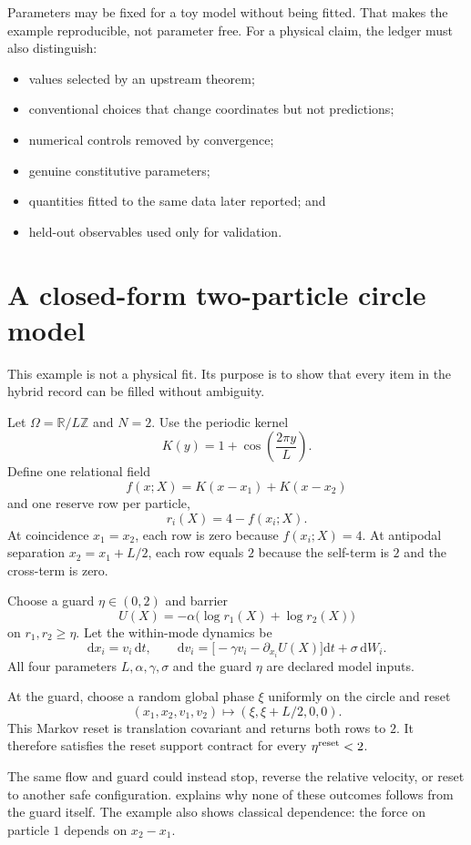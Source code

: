 \documentclass[11pt]{article}
\theoremstyle{definition}
\theoremstyle{remark}
\newcommand{\dd}{\mathrm d}
\begin{document}
Parameters may be fixed for a toy model without being fitted.  That makes
the example reproducible, not parameter free.  For a physical claim, the
ledger must also distinguish:

\begin{itemize}
\item values selected by an upstream theorem;
\item conventional choices that change coordinates but not predictions;
\item numerical controls removed by convergence;
\item genuine constitutive parameters;
\item quantities fitted to the same data later reported; and
\item held-out observables used only for validation.
\end{itemize}

\section{A closed-form two-particle circle model}
\label{sec:example}

This example is not a physical fit.  Its purpose is to show that every item
in the hybrid record can be filled without ambiguity.

Let $\Omega=\mathbb R/L\mathbb Z$ and $N=2$.  Use the periodic kernel
\[
 K(y)=1+\cos\left(\frac{2\pi y}{L}\right).
\]
Define one relational field
\[
 f(x;X)=K(x-x_1)+K(x-x_2)
\]
and one reserve row per particle,
\[
 r_i(X)=4-f(x_i;X).
\]
At coincidence $x_1=x_2$, each row is zero because $f(x_i;X)=4$.  At
antipodal separation $x_2=x_1+L/2$, each row equals $2$ because the
self-term is $2$ and the cross-term is zero.

Choose a guard $\eta\in(0,2)$ and barrier
\[
 U(X)=-\alpha\bigl(\log r_1(X)+\log r_2(X)\bigr)
\]
on $r_1,r_2\ge\eta$.  Let the within-mode dynamics be
\[
 \dd x_i=v_i\,\dd t,
 \qquad
 \dd v_i=
 \bigl[-\gamma v_i-\partial_{x_i}U(X)\bigr]\dd t
 +\sigma\,\dd W_i.
\]
All four parameters $L,\alpha,\gamma,\sigma$ and the guard $\eta$ are
declared model inputs.

At the guard, choose a random global phase $\xi$ uniformly on the circle and
reset
\[
 (x_1,x_2,v_1,v_2)
 \longmapsto
 (\xi,\xi+L/2,0,0).
\]
This Markov reset is translation covariant and returns both rows to $2$.
It therefore satisfies the reset support contract for every
$\eta^{\rm reset}<2$.

The same flow and guard could instead stop, reverse the relative velocity,
or reset to another safe configuration.   explains
why none of these outcomes follows from the guard itself.  The example also
shows classical dependence: the force on particle $1$ depends on
$x_2-x_1$.
\end{document}
